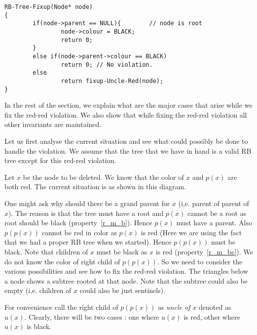 \documentclass[10pt]{article}
\newcommand{\node}{\texttt{node}}
\begin{document}
\begin{verbatim}
RB-Tree-Fixup(Node* node)
{
        if(node->parent == NULL){        // node is root
                node->colour = BLACK;
                return 0;
        }
        else if(node->parent->colour == BLACK)
                return 0; // No violation.
        else
                return fixup-Uncle-Red(node);
}
\end{verbatim}
In the rest of the section, we explain what are the major cases that arise
while we fix the red-red violation. We also show that while fixing the red-red
violation all other invariants are maintained.

Let us first analyse the current situation and see what could possibly be done
to handle the violation. We assume that the tree that we have in hand is a
valid RB tree except for this red-red violation.

Let $x$ be the node to be deleted. We know that the color of $x$ and $p(x)$ 
are both red. The current situation is as shown in this diagram.
\begin{center}
\end{center}
One might ask why should there be a grand parent for $x$ (i,e. parent of
parent of $x$). The reason is that the tree must have a root and
$p(x)$ cannot be a root as root should be black (property~\ref{r_m_b}). Hence
$p(x)$ must have a parent. Also $p(p(x))$ cannot be red in color as $p(x)$ is
red (Here we are using the fact that we had a proper RB tree when we started).
Hence $p(p(x))$ must be black. Note that children of $x$ must be black as $x$
is red (property~\ref{r_m_bc}). We do not know the color of right child of
$p(p(x))$. So we need to consider the various possibilities and see how to fix
the red-red violation. The triangles below a node shows a subtree rooted at
that node. Note that the subtree could also be empty (i,e. children of $x$
could also be just sentinels).

For convenience call the right child of $p(p(x))$ as \emph{uncle of $x$}
denoted as $u(x)$. Clearly, there will be two cases : one where $u(x)$ is red,
other where $u(x)$ is black. 
\end{document}
